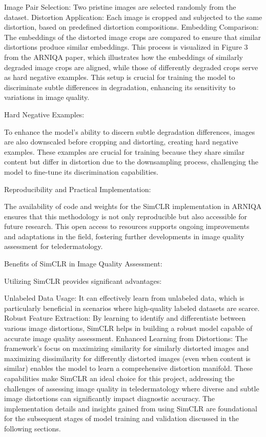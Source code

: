 Image Pair Selection: Two pristine images are selected randomly from the dataset.
Distortion Application: Each image is cropped and subjected to the same distortion, based on predefined distortion compositions.
Embedding Comparison: The embeddings of the distorted image crops are compared to ensure that similar distortions produce similar embeddings.
This process is visualized in Figure 3 from the ARNIQA paper, which illustrates how the embeddings of similarly degraded image crops are aligned, while those of differently degraded crops serve as hard negative examples. This setup is crucial for training the model to discriminate subtle differences in degradation, enhancing its sensitivity to variations in image quality.

Hard Negative Examples:

To enhance the model’s ability to discern subtle degradation differences, images are also downscaled before cropping and distorting, creating hard negative examples. These examples are crucial for training because they share similar content but differ in distortion due to the downsampling process, challenging the model to fine-tune its discrimination capabilities.

Reproducibility and Practical Implementation:

The availability of code and weights for the SimCLR implementation in ARNIQA ensures that this methodology is not only reproducible but also accessible for future research. This open access to resources supports ongoing improvements and adaptations in the field, fostering further developments in image quality assessment for teledermatology.

Benefits of SimCLR in Image Quality Assessment:

Utilizing SimCLR provides significant advantages:

Unlabeled Data Usage: It can effectively learn from unlabeled data, which is particularly beneficial in scenarios where high-quality labeled datasets are scarce.
Robust Feature Extraction: By learning to identify and differentiate between various image distortions, SimCLR helps in building a robust model capable of accurate image quality assessment.
Enhanced Learning from Distortions: The framework’s focus on maximizing similarity for similarly distorted images and maximizing dissimilarity for differently distorted images (even when content is similar) enables the model to learn a comprehensive distortion manifold.
These capabilities make SimCLR an ideal choice for this project, addressing the challenges of assessing image quality in teledermatology where diverse and subtle image distortions can significantly impact diagnostic accuracy. The implementation details and insights gained from using SimCLR are foundational for the subsequent stages of model training and validation discussed in the following sections. \par
\vspace{\baselineskip}
\noindent

